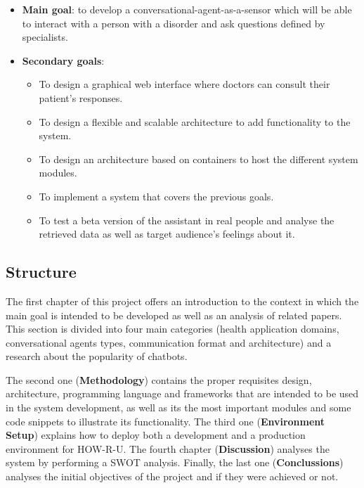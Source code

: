 \documentclass[12pt,english]{article}
\begin{document}
\begin{itemize}
  \item \textbf{Main goal}: to develop a conversational-agent-as-a-sensor which will be able to interact with a person with a disorder and ask questions defined by specialists.
  \item \textbf{Secondary goals}:
    \begin{itemize}
      \item To design a graphical web interface where doctors can consult their patient's responses.
      \item To design a flexible and scalable architecture to add functionality to the system.
      \item To design an architecture based on containers to host the different system modules.
      \item To implement a system that covers the previous goals.
      \item To test a beta version of the assistant in real people and analyse the retrieved data as well as target audience's feelings about it.
    \end{itemize}
\end{itemize}

\subsection{Structure}

The first chapter of this project offers an introduction to the context in which the main goal is intended to be developed as well as an analysis of related papers. This section is divided into four main categories (health application domains, conversational agents types, communication format and architecture) and a research about the popularity of chatbots.

The second one (\textbf{Methodology}) contains the proper requisites design, architecture, programming language and frameworks that are intended to be used in the system development, as well as its the most important modules and some code snippets to illustrate its functionality. The third one (\textbf{Environment Setup}) explains how to deploy both a development and a production environment for HOW-R-U. The fourth chapter (\textbf{Discussion}) analyses the system by performing a SWOT analysis. Finally, the last one (\textbf{Conclussions}) analyses the initial objectives of the project and if they were achieved or not.


\newpage
\end{document}
